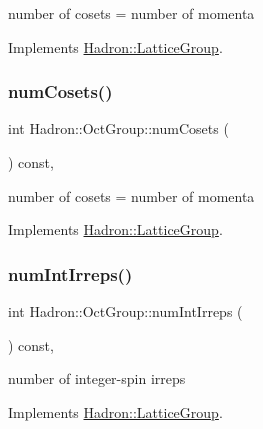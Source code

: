 number of cosets = number of momenta 

Implements \mbox{\hyperlink{structHadron_1_1LatticeGroup_afc76430f36a3a041f86d4058c59bf55e}{Hadron\+::\+Lattice\+Group}}.

\mbox{\label{structHadron_1_1OctGroup_a85ea73ed466c052783d454b14d5b30bc}} 
\subsubsection{\texorpdfstring{numCosets()}{numCosets()}\hspace{0.1cm}{\footnotesize\ttfamily [3/3]}}
{\footnotesize\ttfamily int Hadron\+::\+Oct\+Group\+::num\+Cosets (\begin{DoxyParamCaption}{ }\end{DoxyParamCaption}) const\hspace{0.3cm}{\ttfamily [inline]}, {\ttfamily [virtual]}}

number of cosets = number of momenta 

Implements \mbox{\hyperlink{structHadron_1_1LatticeGroup_afc76430f36a3a041f86d4058c59bf55e}{Hadron\+::\+Lattice\+Group}}.

\mbox{\label{structHadron_1_1OctGroup_abc0b88d4a62fb81c996b6638827cc187}} 
\subsubsection{\texorpdfstring{numIntIrreps()}{numIntIrreps()}\hspace{0.1cm}{\footnotesize\ttfamily [1/3]}}
{\footnotesize\ttfamily int Hadron\+::\+Oct\+Group\+::num\+Int\+Irreps (\begin{DoxyParamCaption}{ }\end{DoxyParamCaption}) const\hspace{0.3cm}{\ttfamily [inline]}, {\ttfamily [virtual]}}

number of integer-\/spin irreps 

Implements \mbox{\hyperlink{structHadron_1_1LatticeGroup_af2aa7b39222bf188389356eefcef7547}{Hadron\+::\+Lattice\+Group}}.

\mbox{\label{structHadron_1_1OctGroup_abc0b88d4a62fb81c996b6638827cc187}} 
